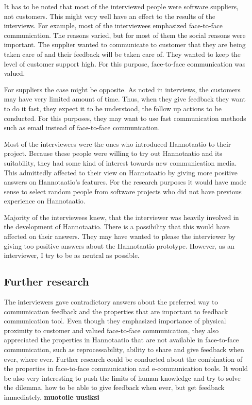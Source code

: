\documentclass[english,12pt,a4paper,pdftex]{article}
\begin{document}
It has to be noted that most of the interviewed people were software suppliers, not customers. This might very well have an effect to the results of the interviews. For example, most of the interviewees emphasized face-to-face communication. The reasons varied, but for most of them the social reasons were important. The supplier wanted to communicate to customer that they are being taken care of and their feedback will be taken care of. They wanted to keep the level of customer support high. For this purpose, face-to-face communication was valued. 

For suppliers the case might be opposite. As noted in interviews, the customers may have very limited amount of time. Thus, when they give feedback they want to do it fast, they expect it to be understood, the follow up actions to be conducted. For this purposes, they may want to use fast communication methods such as email instead of face-to-face communication.

Most of the interviewees were the ones who introduced Hannotaatio to their project. Because these people were willing to try out Hannotaatio and its suitability, they had some kind of interest towards new communication media. This admittedly affected to their view on Hannotaatio by giving more positive answers on Hannotaatio's features. For the research purposes it would have made sense to select random people from software projects who did not have previous experience on Hannotaatio. 

Majority of the interviewees knew, that the interviewer was heavily involved in the development of Hannotaatio. There is a possibility that this would have affected on their answers. They may have wanted to please the interviewer by giving too positive answers about the Hannotaatio prototype. However, as an interviewer, I try to be as neutral as possible.

\subsection{Further research}

The interviewers gave contradictory answers about the preferred way to communication feedback and the properties that are important to feedback communication tool. Even though they emphasized importance of physical proximity to customer and valued face-to-face communication, they also appreciated the properties in Hannotaatio that are not available in face-to-face communication, such as reprocessability, ability to share and give feedback when ever, where ever. Further research could be conducted about the combination of the properties in face-to-face communication and e-communication tools. It would be also very interesting to push the limits of human knowledge and try to solve the dilemma, how to be able to give feedback when ever, but get feedback immediately. \textbf{muotoile uusiksi}
\end{document}
